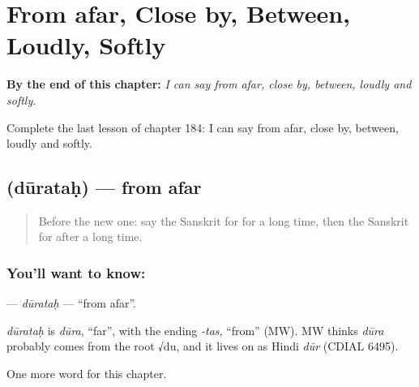 
\chapter{From afar, Close by, Between, Loudly, Softly}
\label{ch:sa-from-afar-close-by-between-loudly-softly}

\begin{chapteropening}
\textbf{By the end of this chapter:} \emph{I can say from afar, close by, between, loudly and softly.}

Complete the last lesson of chapter 184: I can say from afar, close by, between, loudly and softly.
\end{chapteropening}

\section[\texorpdfstring{\sk{दूरतः} (dūrataḥ)}{दूरतः (dūrataḥ)}]{ (dūrataḥ) — from afar}

\label{lesson:SA-C184-duratah}



\begin{quote}
Before the new one: say the Sanskrit for for a long time, then the Sanskrit for after a long time.
\end{quote}

\subsection*{You'll want to know: }
\textbf{} — \emph{dūrataḥ} — \textquotedblleft{}from afar\textquotedblright{}.

\begin{cousinweb}
\emph{dūrataḥ} is \emph{dūra}, \textquotedblleft{}far\textquotedblright{}, with the ending \emph{-tas}, \textquotedblleft{}from\textquotedblright{} (MW). MW thinks \emph{dūra} probably comes from the root √du, and it lives on as Hindi \emph{dūr} (CDIAL 6495).
\end{cousinweb}

\begin{grammarlens}[title={What you've built}]
One more word for this chapter.
\end{grammarlens}

